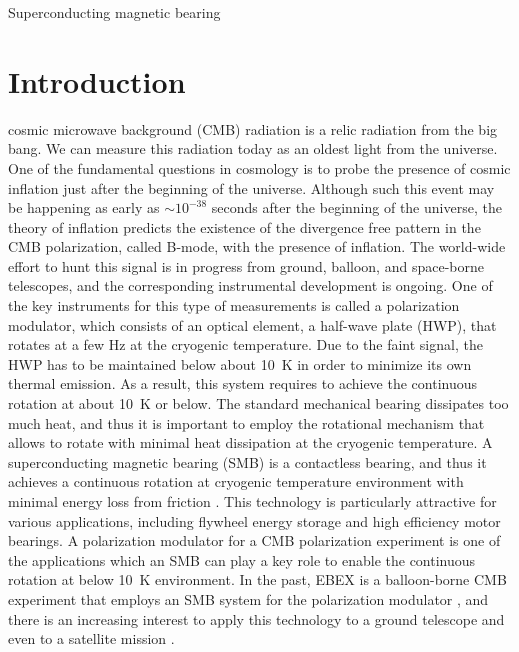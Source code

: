 \documentclass[journal]{IEEEtran}
\begin{document}
\begin{IEEEkeywords}
Superconducting magnetic bearing
\end{IEEEkeywords}

%
\IEEEpeerreviewmaketitle


\section{Introduction}
 cosmic microwave background (CMB) radiation is a relic radiation from the big bang.
We can measure this radiation today as an oldest light from the universe.
One of the fundamental questions in cosmology is to probe the presence of cosmic inflation just after the beginning of the universe.
Although such this event may be happening as early as $\sim10^{-38}$ seconds after the beginning of the universe, the theory of inflation predicts the existence of the divergence free pattern in the CMB polarization, called B-mode, with the presence of inflation.
The world-wide effort to hunt this signal is in progress from ground, balloon, and space-borne telescopes, and the corresponding instrumental development is ongoing.
One of the key instruments for this type of measurements is called a polarization modulator, which consists of an optical element, a half-wave plate (HWP), that rotates at a few Hz at the cryogenic temperature.
Due to the faint signal, the HWP has to be maintained below about 10~K in order to minimize its own thermal emission.
As a result, this system requires to achieve the continuous rotation at about 10~K or below.
The standard mechanical bearing dissipates too much heat, and thus it is important to employ the rotational mechanism that allows to rotate with minimal heat dissipation at the cryogenic temperature.
A superconducting magnetic bearing (SMB) is a contactless bearing, and thus it achieves a continuous rotation at cryogenic temperature environment with minimal energy loss from friction \cite{hull_review}.
This technology is particularly attractive for various applications, including flywheel energy storage and high efficiency motor bearings.
A polarization modulator for a CMB polarization experiment is one of the applications which an SMB can play a key role to enable the continuous rotation at below 10~K environment.
In the past, EBEX is a balloon-borne CMB experiment that employs an SMB system for the polarization modulator \cite{jklein}, and there is an increasing interest to apply this technology to a ground telescope and even to a satellite mission \cite{litebird}.
\end{document}
